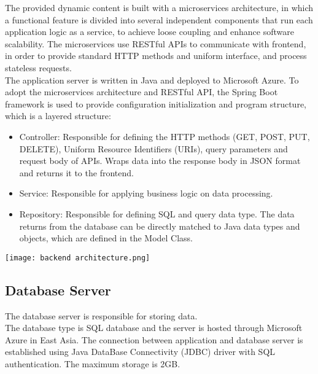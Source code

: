 \documentclass[11pt, a4paper]{article}
\begin{document}
The provided dynamic content is built with a microservices architecture, in which a functional feature is divided into several independent components that run each application logic as a service, to achieve loose coupling and enhance software scalability. The microservices use RESTful APIs to communicate with frontend, in order to provide standard HTTP methods and uniform interface, and process stateless requests.\\

The application server is written in Java and deployed to Microsoft Azure. To adopt the microservices architecture and RESTful API, the Spring Boot framework is used to provide configuration initialization and program structure, which is a layered structure:\\

\begin{minipage}{0.4\textwidth}
\begin{itemize}
    \item Controller: Responsible for defining the HTTP methods (GET, POST, PUT, DELETE), Uniform Resource Identifiers (URIs), query parameters and request body of APIs. Wraps data into the response body in JSON format and returns it to the frontend. \\
    \item Service: Responsible for applying business logic on data processing. \\
    \item Repository: Responsible for defining SQL and query data type. The data returns from the database can be directly matched to Java data types and objects, which are defined in the Model Class.
\end{itemize}
\end{minipage}
\begin{minipage}{0.6\textwidth}
\texttt{[image: backend architecture.png]}
\end{minipage}

\subsection{Database Server}
The database server is responsible for storing data.\\

The database type is SQL database and the server is hosted through Microsoft Azure in East Asia. The connection between application and database server is established using Java DataBase Connectivity (JDBC) driver with SQL authentication. The maximum storage is 2GB.
\end{document}
